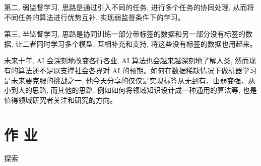 第二, 弱监督学习, 思路是通过引入不同的任务, 进行多个任务的协同处理, 从而将不同任务的算法进行优势互补, 实现弱监督条件下的学习。

第三, 半监督学习, 思路是协同训练一部分带标签的数据和另一部分没有标签的数据, 让二者同时学习多个模型, 互相补充和支持, 将这些没有标签的数据也用起来。

未来十年, AI 会深刻地改变各行各业, AI 算法也会越来越深刻地了解人类, 然而现有的算法还不足以支撑社会各界对 AI 的预期。如何在数据稀缺情况下做机器学习是未来要克服的挑战之一, 他今天分享的仅仅是实现标签从无到有、由弱变强、从小到大的思路, 而其他的思路, 例如如何将领域知识设计成一种通用的算法等, 也是值得领域研究者关注和研究的方向。

\section{作 业 }
\begin{custom}[explorecolor]{探索}

\end{custom}

\begin{think}

\end{think} 